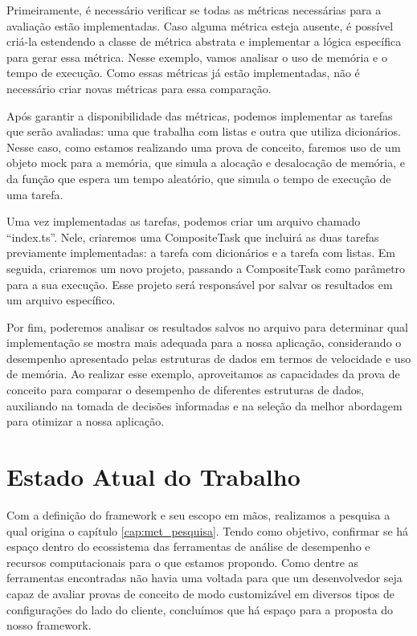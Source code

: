 \documentclass[12pt]{tcc}
\begin{document}
Primeiramente, é necessário verificar se todas as métricas necessárias para a avaliação estão implementadas. Caso alguma métrica esteja ausente, é possível criá-la estendendo a classe de métrica abstrata e implementar a lógica específica para gerar essa métrica. Nesse exemplo, vamos analisar o uso de memória e o tempo de execução. Como essas métricas já estão implementadas, não é necessário criar novas métricas para essa comparação.

Após garantir a disponibilidade das métricas, podemos implementar as tarefas que serão avaliadas: uma que trabalha com listas e outra que utiliza dicionários. Nesse caso, como estamos realizando uma prova de conceito, faremos uso de um objeto mock para a memória, que simula a alocação e desalocação de memória, e da função que espera um tempo aleatório, que simula o tempo de execução de uma tarefa.

Uma vez implementadas as tarefas, podemos criar um arquivo chamado ``index.ts''. Nele, criaremos uma CompositeTask que incluirá as duas tarefas previamente implementadas: a tarefa com dicionários e a tarefa com listas. Em seguida, criaremos um novo projeto, passando a CompositeTask como parâmetro para a sua execução. Esse projeto será responsável por salvar os resultados em um arquivo específico.

Por fim, poderemos analisar os resultados salvos no arquivo para determinar qual implementação se mostra mais adequada para a nossa aplicação, considerando o desempenho apresentado pelas estruturas de dados em termos de velocidade e uso de memória. Ao realizar esse exemplo, aproveitamos as capacidades da prova de conceito para comparar o desempenho de diferentes estruturas de dados, auxiliando na tomada de decisões informadas e na seleção da melhor abordagem para otimizar a nossa aplicação.

\chapter{Estado Atual do Trabalho}
\label{cap:estado_atual}

Com a definição do framework e seu escopo em mãos, realizamos a pesquisa a qual origina o capítulo \ref{cap:met_pesquisa}.
Tendo como objetivo, confirmar se há espaço dentro do ecossistema das ferramentas de análise de desempenho e recursos computacionais para o que estamos propondo.
Como dentre as ferramentas encontradas não havia uma voltada para que um desenvolvedor seja capaz de avaliar provas de conceito de modo customizável em diversos tipos de configurações do lado do cliente, concluímos que há espaço para a proposta do nosso framework.
\end{document}
